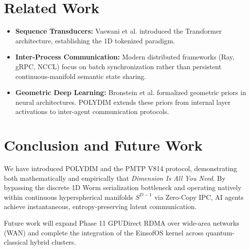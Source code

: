 \documentclass[11pt,twoside,a4paper]{article}
\theoremstyle{plain}
\theoremstyle{definition}
\theoremstyle{remark}
\begin{document}
\section{Related Work}
\label{sec:related_work}

\begin{itemize}
    \item \textbf{Sequence Transducers:} Vaswani et al. \cite{vaswani2017attention} introduced the Transformer architecture, establishing the 1D tokenized paradigm.
    \item \textbf{Inter-Process Communication:} Modern distributed frameworks (Ray, gRPC, NCCL) focus on batch synchronization rather than persistent continuous-manifold semantic state sharing.
    \item \textbf{Geometric Deep Learning:} Bronstein et al. \cite{bronstein2021geometric} formalized geometric priors in neural architectures. POLYDIM extends these priors from internal layer activations to inter-agent communication protocols.
\end{itemize}

\section{Conclusion and Future Work}
\label{sec:conclusion}

We have introduced POLYDIM and the PMTP V814 protocol, demonstrating both mathematically and empirically that \textit{Dimension Is All You Need}. By bypassing the discrete 1D Worm serialization bottleneck and operating natively within continuous hyperspherical manifolds $S^{D-1}$ via Zero-Copy IPC, AI agents achieve instantaneous, entropy-preserving latent communication.

Future work will expand Phase 11 GPUDirect RDMA over wide-area networks (WAN) and complete the integration of the EinsofOS kernel across quantum-classical hybrid clusters.
\end{document}
